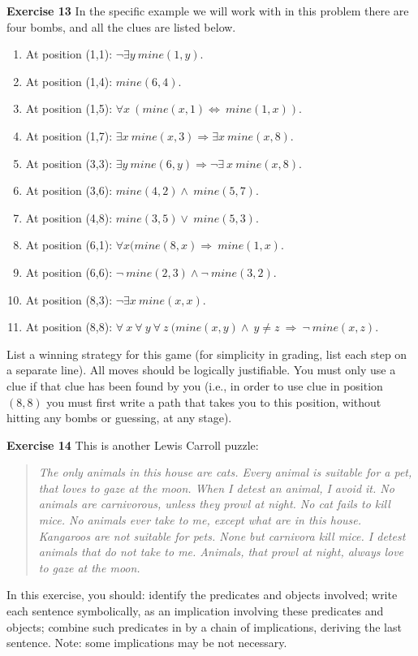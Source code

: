 \documentclass[12pt,oneside]{exam}
\newenvironment{exercise}[1]{\vspace{.1in}\noindent\textbf{Exercise #1 \hspace{.05em}}}{}
\begin{document}
\begin{exercise}{13}
In the specific example we will work with in this problem there are four bombs, and all the clues are listed below. 
\begin{enumerate}
\item At position (1,1): $\neg \exists y \ mine(1,y)$.
\item At position (1,4): $mine(6,4)$. 
\item At position (1,5): $\forall x \ (mine(x,1) \Leftrightarrow \ mine(1,x))$. 
\item At position (1,7): $\exists x \ mine(x,3) \Rightarrow \exists x \ mine(x,8)$.
\item At position (3,3): $\exists y \ mine(6,y) \Rightarrow \neg \exists \ x \ mine(x,8)$.
\item At position (3,6): $mine(4,2)\land \ mine(5,7)$.
\item At position (4,8): $mine(3,5) \lor \ mine(5,3)$. 
\item At position (6,1): $\forall x (mine(8,x) \Rightarrow \ mine(1,x)$.
\item At position (6,6): $\neg \ mine(2,3) \land \neg \ mine(3,2)$.
\item At position (8,3): $\neg \exists x \ mine(x,x)$.
\item At position (8,8): $\forall \ x \ \forall \ y \ \forall \ z \ (mine(x,y) \land \ y \neq z \ \Rightarrow \ \neg \ mine(x,z)$. 
\end{enumerate}

List a winning strategy for this game (for simplicity in grading, list each step on a separate line). All moves should be logically justifiable. You must only use a clue if that clue has been found by you (i.e., in order to use clue in position $(8,8)$ you must first write a path that takes you to this position, without hitting any bombs or guessing, at any stage).
\end{exercise}

\begin{exercise}{14}
This is another Lewis Carroll puzzle:
\begin{quotation}
\textit{The only animals in this house are cats. 
Every animal is suitable for a pet, that loves to gaze at the moon. 
When I detest an animal, I avoid it.
No animals are carnivorous, unless they prowl at night. 
No cat fails to kill mice. 
No animals ever take to me, except what are in this house. 
Kangaroos are not suitable for pets. 
None but carnivora kill mice. 
I detest animals that do not take to me. 
Animals, that prowl at night, always love to gaze at the moon. }
\end{quotation}

In this exercise, you should: identify the predicates and objects involved; write each sentence symbolically, as an implication involving these predicates and objects; combine such predicates in by a chain of implications, deriving the last sentence. Note: some implications may be not necessary. 
\end{exercise}
\end{document}
